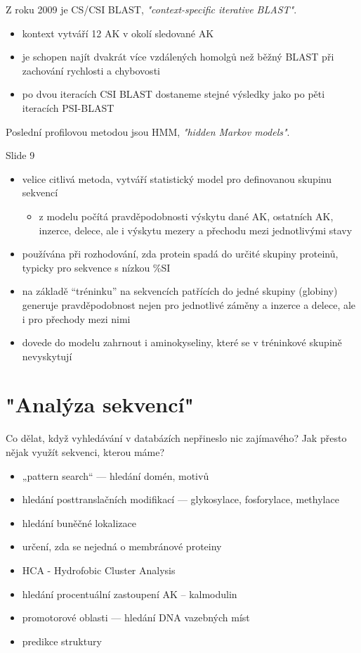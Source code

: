 \documentclass[DIV=8]{scrreprt}
\begin{document}
Z roku 2009 je CS/CSI BLAST, \emph{"context-specific iterative BLAST"}.

\begin{itemize}
    \item kontext vytváří 12 AK v okolí sledované AK
    \item je schopen najít dvakrát více vzdálených homolgů než běžný BLAST při zachování rychlosti a chybovosti
    \item po dvou iteracích CSI BLAST dostaneme stejné výsledky jako po pěti iteracích PSI-BLAST
\end{itemize}


Poslední profilovou metodou jsou HMM, \emph{"hidden Markov models"}.

Slide 9
\begin{itemize}
    \item velice citlivá metoda, vytváří statistický model pro definovanou skupinu sekvencí
\begin{itemize}
    \item z modelu počítá pravděpodobnosti výskytu dané AK, ostatních AK, inzerce, delece, ale i výskytu mezery a přechodu mezi jednotlivými stavy
\end{itemize}

    \item používána při rozhodování, zda protein spadá do určité skupiny proteinů, typicky pro sekvence s nízkou \%SI
    \item na základě “tréninku” na sekvencích patřících do jedné skupiny (globiny) generuje pravděpodobnost nejen pro jednotlivé záměny a inzerce a delece, ale i pro přechody mezi nimi
    \item dovede do modelu zahrnout i aminokyseliny, které se v tréninkové skupině nevyskytují
\end{itemize}


\chapter{"Analýza sekvencí"}

Co dělat, když vyhledávání v databázích nepřineslo nic zajímavého? Jak přesto nějak využít sekvenci, kterou máme?

\begin{itemize}
    \item „pattern search“ --- hledání domén, motivů
    \item hledání posttranslačních modifikací --- glykosylace, fosforylace, methylace
    \item hledání buněčné lokalizace
    \item určení, zda se nejedná o membránové proteiny
    \item HCA - Hydrofobic Cluster Analysis
    \item hledání procentuální zastoupení AK – kalmodulin
    \item promotorové oblasti --- hledání DNA vazebných míst
    \item predikce struktury
\end{itemize}
\end{document}
